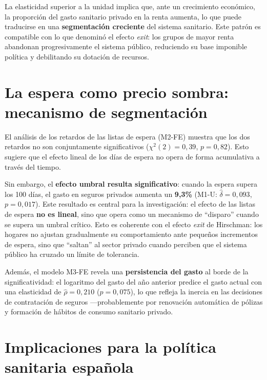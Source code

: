 La elasticidad superior a la unidad implica que, ante un crecimiento económico,
la proporción del gasto sanitario privado en la renta aumenta, lo que puede
traducirse en una \textbf{segmentación creciente} del sistema sanitario. Este
patrón es compatible con lo que \textcite{Hirschman1970} denominó el efecto
\textit{exit}: los grupos de mayor renta abandonan progresivamente el sistema
público, reduciendo su base imponible política y debilitando su dotación de
recursos.

\section{La espera como precio sombra: mecanismo de segmentación}

El análisis de los retardos de las listas de espera (M2-FE) muestra que los dos
retardos no son conjuntamente significativos ($\chi^2(2) = 0{,}39$, $p = 0{,}82$).
Esto sugiere que el efecto lineal de los días de espera no opera de forma
acumulativa a través del tiempo.

Sin embargo, el \textbf{efecto umbral resulta significativo}: cuando la espera
supera los 100 días, el gasto en seguros privados aumenta un \textbf{9{,}3\%}
(M1-U: $\hat{\delta} = 0{,}093$, $p = 0{,}017$). Este resultado es central para
la investigación: el efecto de las listas de espera \textbf{no es lineal}, sino
que opera como un mecanismo de ``disparo'' cuando se supera un umbral crítico.
Esto es coherente con el efecto \textit{exit} de Hirschman: los hogares no ajustan
gradualmente su comportamiento ante pequeños incrementos de espera, sino que
``saltan'' al sector privado cuando perciben que el sistema público ha cruzado
un límite de tolerancia.

Además, el modelo M3-FE revela una \textbf{persistencia del gasto} al borde de
la significatividad: el logaritmo del gasto del año anterior predice el gasto
actual con una elasticidad de $\hat{\rho} = 0{,}210$ ($p = 0{,}075$), lo que
refleja la inercia en las decisiones de contratación de seguros ---probablemente
por renovación automática de pólizas y formación de hábitos de consumo
sanitario privado.

\section{Implicaciones para la política sanitaria española}


